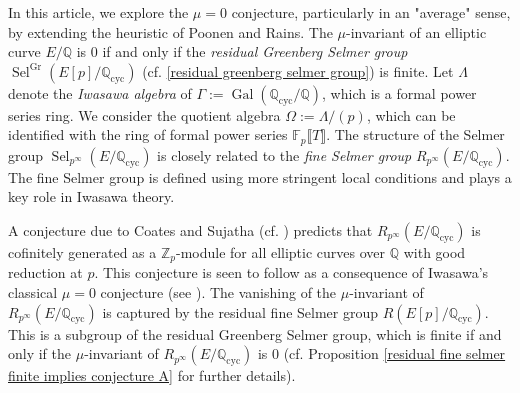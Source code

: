 \documentclass[12pt]{amsart}
\numberwithin{equation}{section}
\begin{document}
In this article, we explore the $\mu = 0$ conjecture, particularly in an "average" sense, by extending the heuristic of Poonen and Rains. The $\mu$-invariant of an elliptic curve $ E/\mathbb{Q} $ is $0$ if and only if the \emph{residual Greenberg Selmer group} $ \operatorname{Sel}^{\operatorname{Gr}}(E[p]/\mathbb{Q}_{\operatorname{cyc}}) $ (cf. \eqref{residual greenberg selmer group}) is finite. Let $ \Lambda $ denote the \textit{Iwasawa algebra} of $ \Gamma := \operatorname{Gal}(\mathbb{Q}_{\operatorname{cyc}}/\mathbb{Q}) $, which is a formal power series ring. We consider the quotient algebra $ \Omega := \Lambda/(p) $, which can be identified with the ring of formal power series $ \mathbb{F}_p\llbracket T \rrbracket $. The structure of the Selmer group $ \operatorname{Sel}_{p^\infty}(E/\mathbb{Q}_{\operatorname{cyc}}) $ is closely related to the \emph{fine Selmer group} $ R_{p^\infty}(E/\mathbb{Q}_{\operatorname{cyc}}) $. The fine Selmer group is defined using more stringent local conditions and plays a key role in Iwasawa theory.
\par A conjecture due to Coates and Sujatha (cf. \cite[Conjecture A]{CoatesSujathaMathAnnalen}) predicts that $ R_{p^\infty}(E/\mathbb{Q}_{\operatorname{cyc}}) $ is cofinitely generated as a $ \mathbb{Z}_p $-module for all elliptic curves over $ \mathbb{Q} $ with good reduction at $ p $. This conjecture is seen to follow as a consequence of Iwasawa's classical $\mu=0$ conjecture (see \cite[Corollary 3.5]{CoatesSujathaMathAnnalen}). The vanishing of the $\mu$-invariant of $ R_{p^\infty}(E/\mathbb{Q}_{\operatorname{cyc}}) $ is captured by the residual fine Selmer group $ R(E[p]/\mathbb{Q}_{\operatorname{cyc}}) $. This is a subgroup of the residual Greenberg Selmer group, which is finite if and only if the $ \mu $-invariant of $ R_{p^\infty}(E/\mathbb{Q}_{\operatorname{cyc}}) $ is $0$ (cf. Proposition \ref{residual fine selmer finite implies conjecture A} for further details).
\end{document}
